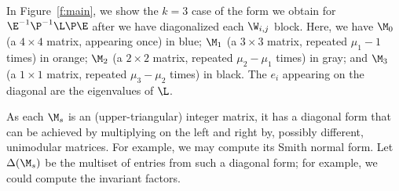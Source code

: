 \begin{example}
In Figure~\ref{f:main}, we show the $k=3$ case of the form we obtain for $\E^{-1} \P^{-1} \L \P \E$ after we have diagonalized each $\W_{i,j}$ block.  Here, we have $\M_0$ (a $4 \times 4$ matrix, appearing once) in blue; $\M_1$ (a $3 \times 3$ matrix, repeated $\mu_1 - 1$ times) in orange; $\M_2$ (a $2 \times 2$ matrix, repeated $\mu_2 - \mu_1$ times) in gray; and $\M_3$ (a $1 \times 1$ matrix, repeated $\mu_3 - \mu_2$ times) in black.  The $e_i$ appearing on the diagonal are the eigenvalues of $\L$.
\end{example}

As each $\M_s$ is an (upper-triangular) integer matrix, it has a diagonal form that can be achieved by multiplying on the left and right by, possibly different, unimodular matrices.  For example, we may compute its Smith normal form.  Let $\Delta(\M_s)$ be the multiset of entries from such a diagonal form; for example, we could compute the invariant factors.

